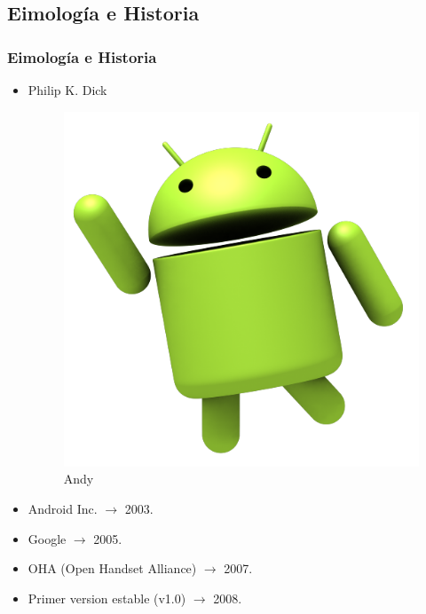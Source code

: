 \subsection{Eimología e Historia}
\begin{frame}
  \frametitle{Eimología e Historia}
  \begin{itemize}
    \item Philip K. Dick
    \begin{figure}
	\includegraphics[scale=0.1]{images/andy.png}
	\caption{Andy}
    \end{figure}
    
    \item Android Inc. $\rightarrow$ 2003.
    
    \item Google $\rightarrow$ 2005.
    
    \item OHA (Open Handset Alliance) $\rightarrow$ 2007.
    
    \item Primer version estable (v1.0) $\rightarrow$ 2008.
  \end{itemize}
\end{frame}

